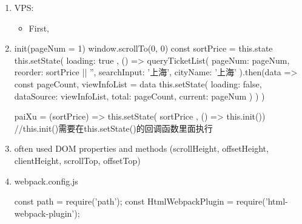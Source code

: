 \documentclass[a4paper,12pt]{article}
\begin{document}
\fontsize{14pt}{15.6pt}
\selectfont


\begin{enumerate}

\item VPS:
\begin{itemize}
  \item First,
\end{itemize}

\item 
\begin{jscode}
init(pageNum = 1) {
	window.scrollTo(0, 0)
	const { sortPrice } = this.state
	this.setState({
		loading: true
	}, () => {
		queryTicketList({
			pageNum: pageNum,
			reorder: sortPrice || '',
			searchInput: '上海',
			cityName: '上海'
		}).then(data => {
			const { pageCount, viewInfoList } = data
			this.setState({
				loading: false,
				dataSource: viewInfoList,
				total: pageCount,
				current: pageNum
			})
		})
	})
}

paiXu = (sortPrice) => {
	this.setState({ sortPrice }, () => this.init())  //this.init()需要在this.setState()的回调函数里面执行
}
\end{jscode}

\item often used DOM properties and methods (scrollHeight, offsetHeight, clientHeight, scrollTop, offsetTop)

\item webpack.config.js
\begin{jscode}
const path = require('path');
const HtmlWebpackPlugin = require('html-webpack-plugin');


\end{jscode}
\end{enumerate}
\end{document}

